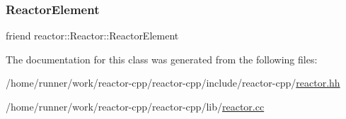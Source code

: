 \subsubsection{\texorpdfstring{Reactor\+Element}{ReactorElement}}
{\footnotesize\ttfamily friend reactor\+::\+Reactor\+::\+Reactor\+Element}



The documentation for this class was generated from the following files\+:\begin{DoxyCompactItemize}
\item 
/home/runner/work/reactor-\/cpp/reactor-\/cpp/include/reactor-\/cpp/\hyperlink{reactor_8hh}{reactor.\+hh}\item 
/home/runner/work/reactor-\/cpp/reactor-\/cpp/lib/\hyperlink{reactor_8cc}{reactor.\+cc}\end{DoxyCompactItemize}
